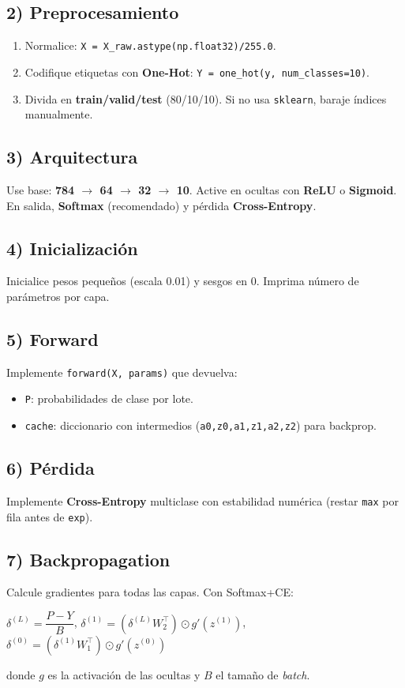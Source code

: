 \documentclass[12pt,a4paper]{article}
\begin{document}
\subsection*{2) Preprocesamiento}
\begin{enumerate}[leftmargin=*,nosep,label=\alph*)]
  \item Normalice: \texttt{X = X\_raw.astype(np.float32)/255.0}.
  \item Codifique etiquetas con \textbf{One-Hot}: \texttt{Y = one\_hot(y, num\_classes=10)}.
  \item Divida en \textbf{train/valid/test} (80/10/10). Si no usa \texttt{sklearn}, baraje índices manualmente.
\end{enumerate}

\subsection*{3) Arquitectura}
Use base: \textbf{784 $\rightarrow$ 64 $\rightarrow$ 32 $\rightarrow$ 10}. Active en ocultas con \textbf{ReLU} o \textbf{Sigmoid}. En salida, \textbf{Softmax} (recomendado) y pérdida \textbf{Cross-Entropy}.

\subsection*{4) Inicialización}
Inicialice pesos pequeños (escala 0.01) y sesgos en 0. Imprima número de parámetros por capa.

\subsection*{5) Forward}
Implemente \texttt{forward(X, params)} que devuelva:
\begin{itemize}[leftmargin=*,nosep]
  \item \texttt{P}: probabilidades de clase por lote.
  \item \texttt{cache}: diccionario con intermedios (\texttt{a0,z0,a1,z1,a2,z2}) para backprop.
\end{itemize}

\subsection*{6) Pérdida}
Implemente \textbf{Cross-Entropy} multiclase con estabilidad numérica (restar \texttt{max} por fila antes de \texttt{exp}).

\subsection*{7) Backpropagation}
Calcule gradientes para todas las capas. Con Softmax+CE:
\begin{center}
$\delta^{(L)} = \dfrac{P - Y}{B}$, \quad
$\delta^{(1)} = (\delta^{(L)} W_2^\top) \odot g'(z^{(1)})$, \quad
$\delta^{(0)} = (\delta^{(1)} W_1^\top) \odot g'(z^{(0)})$
\end{center}
donde $g$ es la activación de las ocultas y $B$ el tamaño de \textit{batch}.
\end{document}
